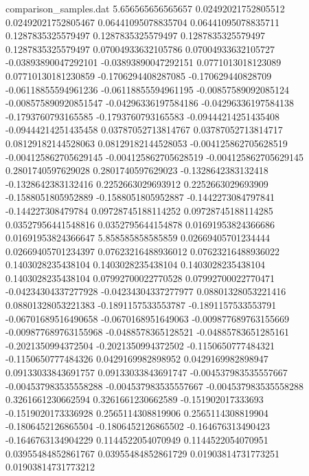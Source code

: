 \begin{filecontents}{comparison_samples.dat}
5.656565656565657   0.02492021752805512     0.02492021752805467     0.06441095078835704    0.06441095078835711    0.1287835325579497     0.1287835325579497     0.1287835325579497     0.1287835325579497     0.07004933632105786    0.07004933632105727    -0.03893890047292101    -0.03893890047292151    0.0771013018123089     0.07710130181230859    -0.1706294408287085     -0.170629440828709      -0.06118855594961236    -0.06118855594961195    -0.00857589092085124    -0.008575890920851547   -0.04296336197584186    -0.04296336197584138    -0.1793760793165585     -0.1793760793165583     -0.09444214251435408    -0.09444214251435458    0.03787052713814767    0.03787052713814717    0.08129182144528063    0.08129182144528053    -0.004125862705628519   -0.004125862705629145   -0.004125862705628519   -0.004125862705629145   0.2801740597629028     0.2801740597629023     -0.1328642383132418     -0.1328642383132416     0.2252663029693912     0.2252663029693909     -0.1588051805952889     -0.1588051805952887     -0.1442273084797841     -0.144227308479784      0.09728745188114252    0.09728745188114285    0.03527956441548816    0.0352795644154878     0.01691953824366686     0.01691953824366647   
5.858585858585859   0.02669405701234444     0.02669405701234397     0.07623216488936012    0.07623216488936022    0.1403028235438104     0.1403028235438104     0.1403028235438104     0.1403028235438104     0.07992700022770528    0.07992700022770471    -0.04234304337277928    -0.04234304337277977    0.08801328053221416    0.08801328053221383    -0.1891157533553787     -0.1891157533553791     -0.06701689516490658    -0.0670168951649063     -0.009877689763155669   -0.009877689763155968   -0.0488578365128521     -0.04885783651285161    -0.2021350994372504     -0.2021350994372502     -0.1150650777484321     -0.1150650777484326     0.0429169982898952     0.0429169982898947     0.09133033843691757    0.09133033843691747    -0.004537983535557667   -0.004537983535558288   -0.004537983535557667   -0.004537983535558288   0.3261661230662594     0.3261661230662589     -0.151902017333693      -0.1519020173336928     0.2565114308819906     0.2565114308819904     -0.1806452126865504     -0.1806452126865502     -0.164676313490423      -0.1646763134904229     0.1144522054070949     0.1144522054070951     0.03955484852861767    0.03955484852861729    0.01903814731773251     0.01903814731773212   

\end{filecontents}
